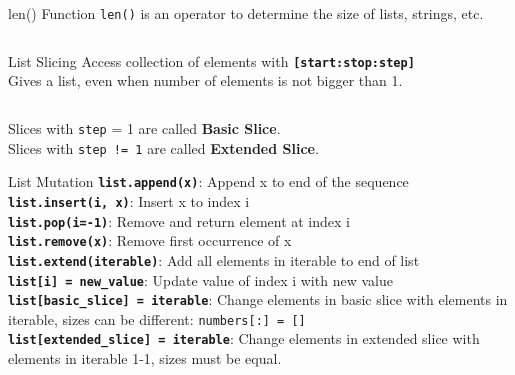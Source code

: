         \begin{frame}{len() Function}
            \pause
            \LARGE
            \texttt{len()} is an operator to determine the size of lists, strings, etc.
            \pause
            \bigskip
            \inputminted[frame=single,framesep=2pt]{python3}{code-examples/length.py}
        \end{frame}

        \begin{frame}{List Slicing}
            \Large
            Access collection of elements with \textbf{\texttt{[start:stop:step]}}\\
            Gives a list, even when number of elements is not bigger than 1.
            \inputminted[frame=single,framesep=2pt,firstline=10]{python3}{../Review1/code-examples/slicing.py}                                
            \LARGE
            Slices with \texttt{step} = 1 are called \textbf{Basic Slice}.\\
            Slices with \texttt{step != 1} are called \textbf{Extended Slice}.
        \end{frame}

        \begin{frame}{List Mutation}
            \Large
            \textbf{\texttt{list.append(x)}}: Append x to end of the sequence\\
            \textbf{\texttt{list.insert(i, x)}}: Insert x to index i\\
            \textbf{\texttt{list.pop(i=-1)}}: Remove and return element at index i\\
            \textbf{\texttt{list.remove(x)}}: Remove first occurrence of x\\
            \textbf{\texttt{list.extend(iterable)}}: Add all elements in iterable to end of list\\
            \textbf{\texttt{list[i] = new\_value}}: Update value of index i with new value\\
            \textbf{\texttt{list[basic\_slice] = iterable}}: Change elements in basic slice with elements in iterable, sizes can be different: \texttt{numbers[:] = []}\\
            \textbf{\texttt{list[extended\_slice] = iterable}}: Change elements in extended slice with elements in iterable 1-1, sizes must be equal.\\
        \end{frame}

